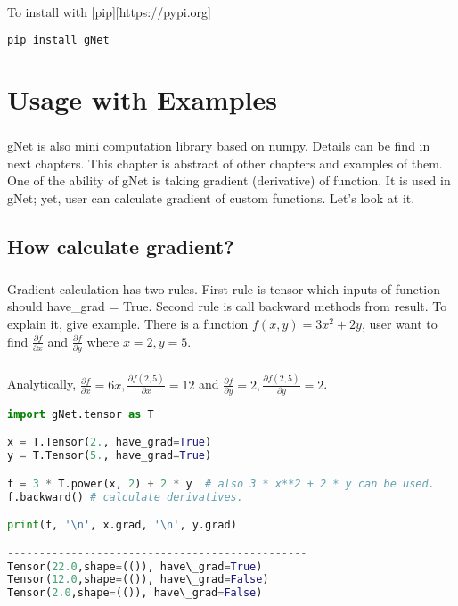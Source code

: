 \documentclass[12pt]{report}
\begin{document}
To install with [pip][https://pypi.org]
\begin{lstlisting}[language=bash, numbers=none, caption={Install with pip}, label={ex:install}]
pip install gNet
\end{lstlisting}



\chapter{Usage with Examples}

\paragraph{}
gNet is also mini computation library based on numpy. Details can be find in next chapters. This chapter is abstract of other chapters and examples of them. One of the ability of gNet is taking gradient (derivative) of function. It is used in gNet; yet, user can calculate gradient of custom functions. Let's look at it.

\section{How calculate gradient?}
\paragraph{}
Gradient calculation has two rules. First rule is tensor which inputs of function should have\_grad = True. Second rule is call backward methods from result. To explain it, give example. There is a function $f(x,y) = 3x^2 + 2y$, user want to find $\frac{\partial f}{\partial x}$ and $\frac{\partial f}{\partial y}$ where $x=2, y=5$. 

\paragraph{}
Analytically, $\frac{\partial f}{\partial x} = 6x, \frac{\partial f(2,5)}{\partial x} = 12$ and  $\frac{\partial f}{\partial y} = 2, \frac{\partial f(2,5)}{\partial y} = 2$. 

\begin{lstlisting}[language=Python, numbers=none, caption={Calculation of gradient.}, label={ex:grad-calc}]
import gNet.tensor as T

x = T.Tensor(2., have_grad=True)
y = T.Tensor(5., have_grad=True)

f = 3 * T.power(x, 2) + 2 * y  # also 3 * x**2 + 2 * y can be used.
f.backward() # calculate derivatives. 

print(f, '\n', x.grad, '\n', y.grad)

-----------------------------------------------
Tensor(22.0,shape=(()), have\_grad=True) 
Tensor(12.0,shape=(()), have\_grad=False)
Tensor(2.0,shape=(()), have\_grad=False)
\end{lstlisting}
\end{document}
